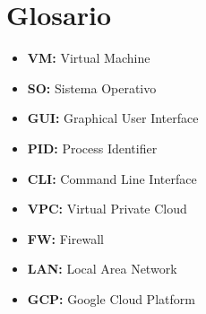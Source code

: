 \newpage
\thispagestyle{plain}
\section*{Glosario}

\begin{itemize}
  \item \textbf{VM:} Virtual Machine
  \item \textbf{SO:} Sistema Operativo
  \item \textbf{GUI:} Graphical User Interface
  \item \textbf{PID:} Process Identifier
  \item \textbf{CLI:} Command Line Interface
  \item \textbf{VPC:} Virtual Private Cloud
  \item \textbf{FW:} Firewall
  \item \textbf{LAN:} Local Area Network
  \item \textbf{GCP:} Google Cloud Platform
\end{itemize}

\afterpage{\blankpage}
